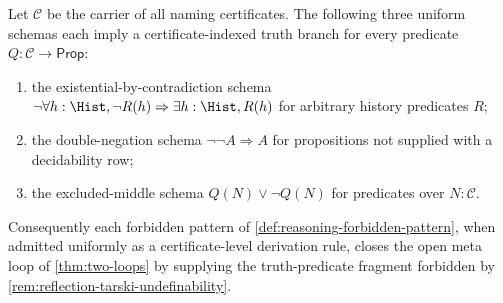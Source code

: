 \begin{theorem}
\label{thm:reasoning-forbidden-schemas-produce-certificate-truth-branches}
Let $\mathcal C$ be the carrier of all naming certificates. The following three uniform schemas each imply a certificate-indexed truth branch for every predicate $Q:\mathcal C\to\mathsf{Prop}$:
\begin{enumerate}
\item the existential-by-contradiction schema $\neg\forall h:\Hist,\neg R(h)\Rightarrow\exists h:\Hist,R(h)$ for arbitrary history predicates $R$;
\item the double-negation schema $\neg\neg A\Rightarrow A$ for propositions not supplied with a decidability row;
\item the excluded-middle schema $Q(N)\vee\neg Q(N)$ for predicates over $N:\mathcal C$.
\end{enumerate}
Consequently each forbidden pattern of \autoref{def:reasoning-forbidden-pattern}, when admitted uniformly as a certificate-level derivation rule, closes the open meta loop of \autoref{thm:two-loops} by supplying the truth-predicate fragment forbidden by \autoref{rem:reflection-tarski-undefinability}.
\end{theorem}


